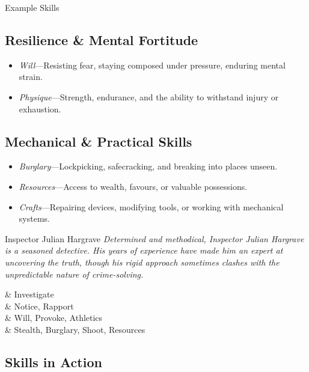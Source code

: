 \begin{WyrdExampleSidebar}[float=!t]{Example Skills}
	\subsection*{Resilience \& Mental Fortitude}  
	\begin{itemize}
    	\item \emph{Will}---Resisting fear, staying composed under pressure, enduring mental strain.
	    \item \emph{Physique}---Strength, endurance, and the ability to withstand injury or exhaustion.
	\end{itemize}

	\subsection*{Mechanical \& Practical Skills}  
	\begin{itemize}
    	\item \emph{Burglary}---Lockpicking, safecracking, and breaking into places unseen.
	    \item \emph{Resources}---Access to wealth, favours, or valuable possessions.
	    \item \emph{Crafts}---Repairing devices, modifying tools, or working with mechanical systems.
	\end{itemize}
\end{WyrdExampleSidebar}

\begin{WyrdNPC}[float=!t]{Inspector Julian Hargrave}
	\emph{Determined and methodical, Inspector Julian Hargrave is a seasoned detective. His years of experience have made him an expert at uncovering the truth, though his rigid approach sometimes clashes with the unpredictable nature of crime-solving.}

	\vspace{0.5\baselineskip}
	\begin{SkillsBox}
		\Expert & Investigate \\
		\Skilled & Notice, Rapport \\
		\Novice & Will, Provoke, Athletics \\
		\Untrained & Stealth, Burglary, Shoot, Resources \\
	\end{SkillsBox}

\end{WyrdNPC}


\subsection{Skills in Action}

